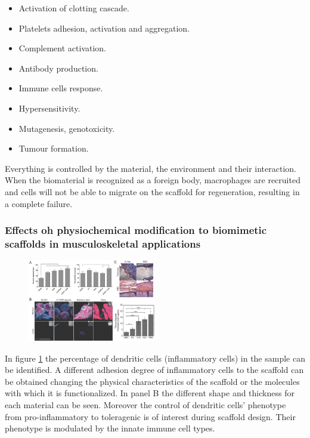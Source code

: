 	\begin{multicols}{2}
		\begin{itemize}
			\item Activation of clotting cascade.
			\item Platelets adhesion, activation and aggregation.
			\item Complement activation.
			\item Antibody production.
			\item Immune cells response.
			\item Hypersensitivity.
			\item Mutagenesis, genotoxicity.
			\item Tumour formation.
		\end{itemize}
	\end{multicols}

	Everything is controlled by the material, the environment and their interaction.
	When the biomaterial is recognized as a foreign body, macrophages are recruited and cells will not be able to migrate on the scaffold for regeneration, resulting in a complete failure.

		\subsubsection{Effects oh physiochemical modification to biomimetic scaffolds in musculoskeletal applications}

		\begin{figure}[ht]
			\centering
			\includegraphics[width=0.5\textwidth]{muscosk}
			\caption{\label{fig:muscosk}}
		\end{figure}

		In figure \ref{fig:muscosk} the percentage of dendritic cells (inflammatory cells) in the sample can be identified.
		A different adhesion degree of inflammatory cells to the scaffold can be obtained changing the physical characteristics of the scaffold or the molecules with which it is functionalized.
		In panel B the different shape and thickness for each material can be seen.
		Moreover the control of dendritic cells' phenotype from pro-inflammatory to toleragenic is of interest during scaffold design.
		Their phenotype is modulated by the innate immune cell types.

